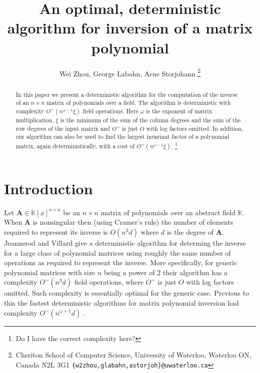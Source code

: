 \documentclass[a4paper,11pt]{article}
\title{An optimal, deterministic algorithm for inversion of a matrix polynomial}
\author{
Wei Zhou, George Labahn, Arne Storjohann
         \thanks{
             Cheriton School of Computer Science, University of Waterloo, 
             Waterloo ON, Canada N2L 3G1 \texttt{\{w2zhou,glabahn,astorjoh\}@uwaterloo.ca}
          }
}
\begin{document}
%

\date{}
\maketitle 
\begin{abstract}
In this paper we present a deterministic algorithm for the computation of the inverse of 
an $n\times n$ matrix of polynomials over a field. The algorithm is deterministic with complexity  $O^{\sim}\left(n^{\omega-1}\xi\right)$ field operations. Here $\omega$ is the exponent of matrix multiplication, $\xi$ is the minimum of the  
sum of the column degrees and the sum of the row degrees of the input matrix and $O^{\sim}$ is just $O$ with log factors omitted. In addition, our algorithm can also be used to find the largest invariant factor of a polynomial matrix, again deterministically, with a cost of $O^{\sim}\left(n^{\omega-1}\xi\right)$.
\footnote{Do I have the correct complexity here?}
\end{abstract}
%

\section{Introduction}

Let $\mathbf{A} \in \mathbb{K}\left[x\right]^{n\times n}$ be an $n \times n$ matrix of polynomials over an abstract field $\mathbb{K}$. When $\mathbf{A}$ is nonsingular then (using Cramer's rule) the
number of elements required to represent its inverse is $O(n^3 d)$ where $d$ is the degree of $\mathbf{A}$. Jeannerod and Villard \cite{jeannerod-villard:05} give a deterministic algorithm for determing the inverse for a large class of polynomial matrices using roughly the same number of operations as required to represent the inverse. More specifically, for generic polynomial matrices with size $n$ being a power of $2$ their algorithm has a complexity $O^{\sim}\left(n^{3} d \right)$ field operations, where  $O^{\sim}$ is just $O$ with log factors omitted. Such complexity is essentially optimal for the generic case. %
Previous to this the fastest deterministic algorithms for matrix polynomial inversion had complexity $O^{\sim}\left(n^{\omega + 1} d \right)$ \cite{burgisser,storjohannPhD}.
\end{document}
